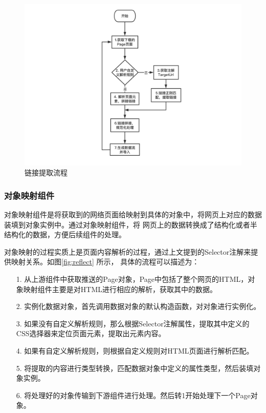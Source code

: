 \documentclass[master]{njuthesis}
\begin{document}
\begin{figure}
\centering
\includegraphics[width=1\textwidth]{pic/linkExtract.png}
\caption{链接提取流程}\label{fig:link}
\end{figure}

\subsubsection{对象映射组件}
对象映射组件是将获取到的网络页面给映射到具体的对象中，将网页上对应的数据装填到对象实例中。通过对象映射组件，将
网页上的数据转换成了结构化或者半结构化的数据，方便后续组件的处理。

对象映射的过程实质上是页面内容解析的过程，通过上文提到的Selector注解来提供映射关系。如图\ref{fig:reflect} 所示，
具体的流程可以描述为：

\begin{enumerate}
  \item[1.] 从上游组件中获取推送的Page对象，Page中包括了整个网页的HTML，对象映射组件主要是对HTML进行相应的解析，获取其中的数据。
  \item[2.] 实例化数据对象，首先调用数据对象的默认构造函数，对对象进行实例化。
  \item[3.] 如果没有自定义解析规则，那么根据Selector注解属性，提取其中定义的CSS选择器来定位页面元素，提取出元素内容。
  \item[4.] 如果有自定义解析规则，则根据自定义规则对HTML页面进行解析匹配。
  \item[5.] 将提取的内容进行类型转换，匹配数据对象中定义的属性类型，然后装填对象实例。
  \item[6.] 将处理好的对象传输到下游组件进行处理。然后转1开始处理下一个Page对象。
\end{enumerate}
\end{document}
